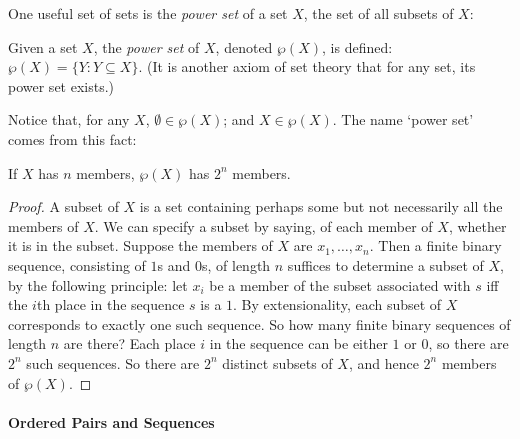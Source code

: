 One useful set of sets is the \emph{power set} of a set $X$, the set of all subsets of $X$:
 \begin{definition}Given a set $X$, the \emph{power set} of $X$, denoted $\wp(X)$, is
defined: $\wp(X) = \{Y: Y \subseteq X\}$. (It is another axiom of set theory that for any set, its power set exists.)\end{definition} 
Notice that, for any $X$, $\emptyset \in \wp(X)$; and $X \in \wp(X)$. The name `power set' comes from this fact: 
\begin{theorem} If $X$ has $n$ members, $\wp(X)$ has $2^{n}$ members.
	\begin{proof}
		A subset of $X$ is a set containing perhaps some but not necessarily all the members of $X$. We can specify a subset by saying, of each member of $X$, whether it is in the subset.  Suppose the members of $X$ are $x_{1},\ldots,x_{n}$. Then a finite binary sequence, consisting of $1$s and $0$s, of length $n$ suffices to determine a subset of $X$, by the following principle: let $x_{i}$ be a member of the subset associated with $s$ iff the $i$th place in the sequence $s$ is a $1$. By extensionality, each subset of $X$ corresponds to exactly one such sequence. So how many finite binary sequences of length $n$ are there? Each place $i$ in the sequence can be either $1$ or $0$, so there are $2^{n}$ such sequences. So there are $2^n$ distinct subsets of $X$, and hence $2^{n}$ members of $\wp(X)$. 
	\end{proof}
 \end{theorem}

\paragraph{Ordered Pairs and Sequences}

